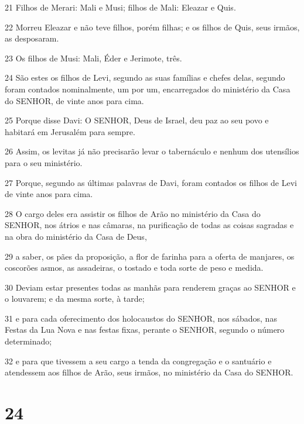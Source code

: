 \par 21 Filhos de Merari: Mali e Musi; filhos de Mali: Eleazar e Quis.
\par 22 Morreu Eleazar e não teve filhos, porém filhas; e os filhos de Quis, seus irmãos, as desposaram.
\par 23 Os filhos de Musi: Mali, Éder e Jerimote, três.
\par 24 São estes os filhos de Levi, segundo as suas famílias e chefes delas, segundo foram contados nominalmente, um por um, encarregados do ministério da Casa do SENHOR, de vinte anos para cima.
\par 25 Porque disse Davi: O SENHOR, Deus de Israel, deu paz ao seu povo e habitará em Jerusalém para sempre.
\par 26 Assim, os levitas já não precisarão levar o tabernáculo e nenhum dos utensílios para o seu ministério.
\par 27 Porque, segundo as últimas palavras de Davi, foram contados os filhos de Levi de vinte anos para cima.
\par 28 O cargo deles era assistir os filhos de Arão no ministério da Casa do SENHOR, nos átrios e nas câmaras, na purificação de todas as coisas sagradas e na obra do ministério da Casa de Deus,
\par 29 a saber, os pães da proposição, a flor de farinha para a oferta de manjares, os coscorões asmos, as assadeiras, o tostado e toda sorte de peso e medida.
\par 30 Deviam estar presentes todas as manhãs para renderem graças ao SENHOR e o louvarem; e da mesma sorte, à tarde;
\par 31 e para cada oferecimento dos holocaustos do SENHOR, nos sábados, nas Festas da Lua Nova e nas festas fixas, perante o SENHOR, segundo o número determinado;
\par 32 e para que tivessem a seu cargo a tenda da congregação e o santuário e atendessem aos filhos de Arão, seus irmãos, no ministério da Casa do SENHOR.

\chapter{24}

